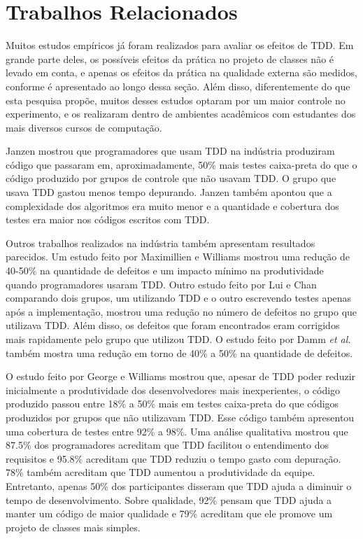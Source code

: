 \section{Trabalhos Relacionados}
\label{cap:trabalhos-relacionados}

Muitos estudos empíricos já foram realizados para avaliar os efeitos de TDD.
Em grande parte deles, os possíveis efeitos da prática no projeto de classes não é 
levado em conta, e apenas os efeitos da prática na qualidade externa são
medidos, conforme é apresentado ao longo dessa seção.
Além disso, diferentemente
do que esta pesquisa propõe, muitos desses estudos optaram por um
maior controle no experimento, e os realizaram dentro de ambientes acadêmicos 
com estudantes dos mais diversos cursos de computação.

Janzen \cite{janzen-arch-improvement} mostrou que programadores que usam TDD na 
indústria produziram código que passaram em, aproximadamente, 50\% mais testes 
caixa-preta do que o código produzido por grupos de controle que não usavam TDD.
O grupo que usava TDD gastou menos tempo depurando. Janzen também 
apontou que a complexidade dos algoritmos era muito menor e a quantidade e
cobertura dos testes era maior nos códigos escritos com TDD.

Outros trabalhos realizados na indústria também apresentam resultados parecidos.
Um estudo feito por Maximillien e Williams \cite{max-e-williams} mostrou uma
redução de 40-50\% na quantidade de defeitos e um impacto mínimo na
produtividade quando programadores usaram TDD. Outro estudo feito por Lui e
Chan \cite{lui-e-chan} comparando dois grupos, um utilizando TDD e o outro 
escrevendo testes apenas após a implementação, mostrou uma redução  
no número de defeitos no grupo que utilizava TDD. 
Além disso, os defeitos que foram encontrados eram 
corrigidos mais rapidamente pelo grupo que utilizou TDD. O estudo feito por 
Damm \textit{et al.} \cite{damn-lundberg-e-olson} também mostra uma redução
em torno de 40\% a 50\% na quantidade de defeitos.

O estudo feito por George e Williams \cite{george-e-williams} mostrou que,
apesar de TDD poder reduzir inicialmente a produtividade dos desenvolvedores 
mais inexperientes, o código produzido passou entre 18\% a 50\% mais em testes 
caixa-preta do que códigos produzidos por grupos que não utilizavam TDD. Esse
código também apresentou uma cobertura de testes entre 92\% a 98\%. Uma análise
qualitativa mostrou que 87.5\% dos programadores acreditam que TDD facilitou o 
entendimento dos requisitos e 95.8\% acreditam que TDD reduziu o tempo gasto com
depuração. 78\% também acreditam que TDD aumentou a produtividade da equipe. 
Entretanto, apenas 50\% dos participantes disseram que TDD ajuda a diminuir o tempo de 
desenvolvimento. Sobre qualidade, 92\% pensam que TDD ajuda a manter um
código de maior qualidade e 79\% acreditam que ele promove um projeto de classes mais simples.

